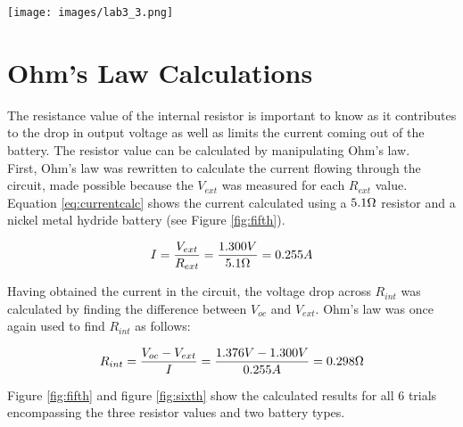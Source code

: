 \documentclass[journal]{IEEEtran}
\begin{document}
\begingroup
    \medskip
    \centering
    \texttt{[image: images/lab3\_3.png]}
    \label{fig:second}
    \medskip
\endgroup


\section{Ohm's Law Calculations}

\noindent The resistance value of the internal resistor is important to know as it contributes to the drop in output voltage as well as limits the current coming out of the battery. The resistor value can be calculated by manipulating Ohm's law.\\ 

\noindnet First, Ohm's law was rewritten to calculate the current flowing through the circuit, made possible because the $V_{ext}$ was measured for each $R_{ext}$ value. Equation \ref{eq:currentcalc} shows the current calculated using a $5.1 \ohm$ resistor and a nickel metal hydride battery (see Figure \ref{fig:fifth}).

\begin{equation}
I = \frac{V_{ext}}{R_{ext}} = \frac{1.300V}{5.1\ohm} = 0.255A
\label{eq:currentcalc}
\end{equation}

\noindent Having obtained the current in the circuit, the voltage drop across $R_{int}$ was calculated by finding the difference between $V_{oc}$ and $V_{ext}$. Ohm's law was once again used to find $R_{int}$ as follows:

\begin{equation}
R_{int} = \frac{V_{oc}-V_{ext}}{I} = \frac{1.376V-1.300V}{0.255A} = 0.298\ohm
\label{eq:rintcalc}
\end{equation}

\noindent Figure \ref{fig:fifth} and figure \ref{fig:sixth} show the calculated results for all 6 trials encompassing the three resistor values and two battery types. 
\end{document}
